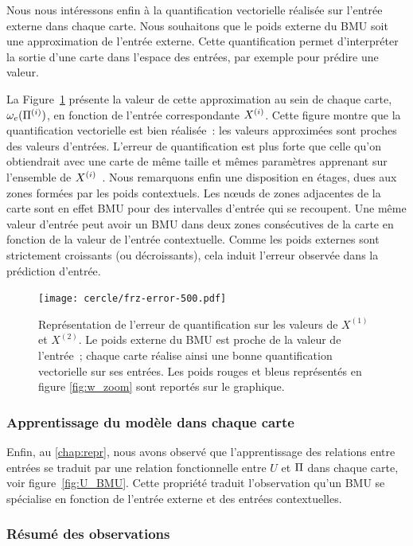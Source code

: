 \documentclass[../main]{subfiles}
\begin{document}
Nous nous intéressons enfin à la quantification vectorielle réalisée sur l'entrée externe dans chaque carte. 
Nous souhaitons que le poids externe du BMU soit une approximation de l'entrée externe. Cette quantification permet d'interpréter la sortie d'une carte dans l'espace des entrées, par exemple pour prédire une valeur.

La Figure~\ref{fig:qv} présente la valeur de cette approximation au sein de chaque carte, $\omega_{e}(\Pi^{({i})})$, en fonction de l'entrée correspondante $X^{({i})}$. 
Cette figure montre que la quantification vectorielle est bien réalisée~: les valeurs approximées sont proches des valeurs d'entrées.
L'erreur de quantification est plus forte que celle qu'on obtiendrait avec une carte de même taille et mêmes paramètres apprenant sur l'ensemble de $X^{({i})}$~. 
Nous remarquons enfin une disposition en étages, dues aux zones formées par les poids contextuels.
Les n\oe{}uds de zones adjacentes de la carte sont en effet BMU pour des intervalles d'entrée qui se recoupent.
Une même valeur d'entrée peut avoir un BMU dans deux zones consécutives de la carte en fonction de la valeur de l'entrée contextuelle. Comme les poids externes sont strictement croissants (ou décroissants), cela induit l'erreur observée dans la prédiction d'entrée.

\begin{figure}[h!]
	\centering\texttt{[image: cercle/frz-error-500.pdf]}
	\caption{Représentation de l'erreur de quantification sur les valeurs de $X^{(1)}$ et $X^{(2)}$. Le poids externe du BMU est proche de la valeur de l'entrée~; chaque carte réalise ainsi une bonne quantification vectorielle sur ses entrées. 
	Les poids rouges et bleus représentés en figure \ref{fig:w_zoom} sont reportés sur le graphique. \label{fig:qv}}
\end{figure}

\subsubsection{Apprentissage du modèle dans chaque carte}

Enfin, au \ref{chap:repr}, nous avons observé que l'apprentissage des relations entre entrées se traduit par une relation fonctionnelle entre $U$ et $\Pi$ dans chaque carte, voir figure~\ref{fig:U_BMU}.
Cette propriété traduit l'observation qu'un BMU se spécialise en fonction de l'entrée externe et des entrées contextuelles.

\subsubsection{Résumé des observations}
\end{document}
